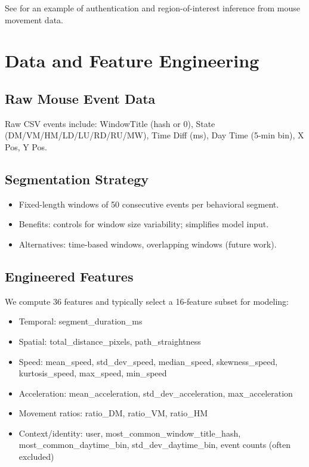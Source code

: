 \documentclass[
  12pt,
]{article}
\providecommand{\tightlist}{%
  \setlength{\itemsep}{0pt}\setlength{\parskip}{0pt}}
\begin{document}
See \cite{rahman2021} for an example of authentication and
region-of-interest inference from mouse movement data.

\section{Data and Feature
Engineering}\label{data-and-feature-engineering}

\subsection{Raw Mouse Event Data}\label{raw-mouse-event-data}

Raw CSV events include: WindowTitle (hash or 0), State
(DM/VM/HM/LD/LU/RD/RU/MW), Time Diff (ms), Day Time (5-min bin), X Pos,
Y Pos.

\subsection{Segmentation Strategy}\label{segmentation-strategy}

\begin{itemize}
\tightlist
\item
  Fixed-length windows of 50 consecutive events per behavioral segment.
\item
  Benefits: controls for window size variability; simplifies model
  input.
\item
  Alternatives: time-based windows, overlapping windows (future work).
\end{itemize}

\subsection{Engineered Features}\label{engineered-features}

We compute 36 features and typically select a 16-feature subset for
modeling:

\begin{itemize}
\tightlist
\item
  Temporal: segment\_duration\_ms
\item
  Spatial: total\_distance\_pixels, path\_straightness
\item
  Speed: mean\_speed, std\_dev\_speed, median\_speed, skewness\_speed,
  kurtosis\_speed, max\_speed, min\_speed
\item
  Acceleration: mean\_acceleration, std\_dev\_acceleration,
  max\_acceleration
\item
  Movement ratios: ratio\_DM, ratio\_VM, ratio\_HM
\item
  Context/identity: user, most\_common\_window\_title\_hash,
  most\_common\_daytime\_bin, std\_dev\_daytime\_bin, event counts
  (often excluded)
\end{itemize}
\end{document}
